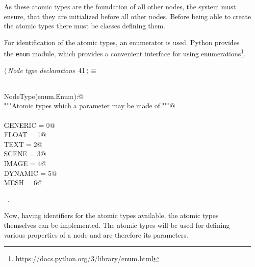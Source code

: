 \documentclass[
    a4paper,      %
    10pt,         %
    openright,    %
    notitlepage,  %
    parskip=half, %
]{scrreprt}       %
\theoremstyle{definition}                    %
\begin{document}
As these atomic types are the foundation of all other nodes, the system must
ensure, that they are initialized before all other nodes. Before being able to
create the atomic types there must be classes defining them.

For identification of the atomic types, an enumerator is used. Python provides
the \verb+enum+ module, which provides a convenient interface for using
enumerations\footnote{https://docs.python.org/3/library/enum.html}.

\begin{flushleft} \small
\begin{minipage}{\linewidth}\label{scrap49}\raggedright\small
{} $\langle\,${\itshape Node type declarations}\nobreak\ {\footnotesize {41}}$\,\rangle\equiv$
\vspace{-1ex}
\begin{list}{}{} \item
\mbox{}\lstinline@@\\
\mbox{}\lstinline@class NodeType(enum.Enum):@\\
\mbox{}\lstinline@    """Atomic types which a parameter may be made of."""@\\
\mbox{}\lstinline@@\\
\mbox{}\lstinline@    GENERIC = 0@\\
\mbox{}\lstinline@    FLOAT   = 1@\\
\mbox{}\lstinline@    TEXT    = 2@\\
\mbox{}\lstinline@    SCENE   = 3@\\
\mbox{}\lstinline@    IMAGE   = 4@\\
\mbox{}\lstinline@    DYNAMIC = 5@\\
\mbox{}\lstinline@    MESH    = 6@\\
\mbox{}\lstinline@@{\NWsep}
\end{list}
\vspace{-1.5ex}
\footnotesize
\begin{list}{}{\setlength{\itemsep}{-\parsep}\setlength{\itemindent}{-\leftmargin}}
\item \NWtxtMacroRefIn\ .

\item{}
\end{list}
\end{minipage}\vspace{4ex}
\end{flushleft}
Now, having identifiers for the atomic types available, the atomic types
themselves can be implemented. The atomic types will be used for defining
various properties of a node and are therefore its parameters.
\end{document}

